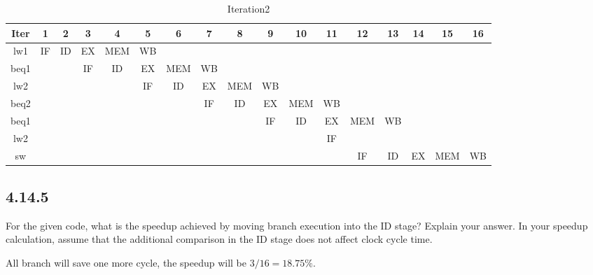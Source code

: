 \documentclass[paper=a4, fontsize=11pt]{scrartcl} %
\begin{document}
\begin{table}[H]
    \caption{Iteration2}\label{tab:iteration2}
    \begin{center}
        \scriptsize
        \begin{tabular}{ccccccccccccccccc}
        \toprule
        \textbf{Iter} & \textbf{1} & \textbf{2} & \textbf{3} & \textbf{4} & \textbf{5}
        & \textbf{6} & \textbf{7} & \textbf{8} & \textbf{9} & \textbf{10} & \textbf{11}
        & \textbf{12} & \textbf{13} & \textbf{14} & \textbf{15} & \textbf{16} \\
        \midrule
        lw1  & IF & ID & EX & MEM & WB &    &    &    &    &    &    &    &    &    &    & \\ %
        beq1 &    &    & IF & ID & EX & MEM & WB &    &    &    &    &    &    &    &    & \\ %
        lw2  &    &    &    &    & IF & ID & EX & MEM & WB &    &    &    &    &    &    & \\ %
        beq2 &    &    &    &    &    &    & IF & ID & EX & MEM & WB &    &    &    &    & \\ %
        beq1 &    &    &    &    &    &    &    &    & IF & ID & EX & MEM & WB &    &    & \\ %
        lw2  &    &    &    &    &    &    &    &    &    &    & IF &    &     &    &    & \\ %
        sw   &    &    &    &    &    &    &    &    &    &    &    & IF & ID & EX & MEM & WB \\
        \bottomrule
        \end{tabular}
    \end{center}
\end{table}


\subsection{4.14.5}
\begin{fancyquotes}
    For the given code, what is the speedup achieved by moving branch execution into the ID stage? Explain your answer. In your speedup calculation, assume that the additional comparison in the ID stage does not affect clock cycle time.
\end{fancyquotes}

All branch will save one more cycle, the speedup will be $3/16=18.75\%$.


\end{document}
